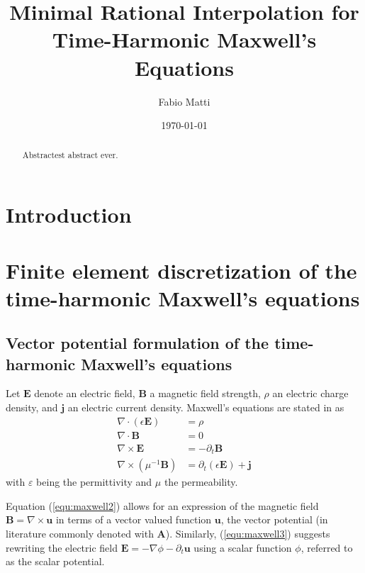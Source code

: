 \documentclass[11pt, a4paper]{article}
\title{Minimal Rational Interpolation for Time-Harmonic Maxwell's Equations}
\author{Fabio Matti}
\date{\today}
\begin{document}
\maketitle

\begin{abstract}
    Abstractest abstract ever.
\end{abstract}

\newpage
\printglossary[type=\acronymtype, nonumberlist]

\newpage
\tableofcontents

\newpage
\section{Introduction}
\label{sec:introduction}

\newpage
\section{Finite element discretization of the time-harmonic Maxwell's equations}
\label{sec:maxwell}

\subsection{Vector potential formulation of the time-harmonic Maxwell's equations}
\label{subsec:maxwell-potential}
\the\textwidth


Let $\mathbf{E}$ denote an electric field, $\mathbf{B}$ a magnetic field
strength, $\rho$ an electric charge density, and $\mathbf{j}$ an electric
current density. Maxwell's equations are stated in \citep{monk} as
\begin{align}
    \nabla \cdot (\epsilon \mathbf{E}) &= \rho \label{equ:maxwell1} \\
    \nabla \cdot \mathbf{B} &= 0 \label{equ:maxwell2} \\
    \nabla \times \mathbf{E} &= -\partial_t \mathbf{B} \label{equ:maxwell3} \\
    \nabla \times (\mu^{-1} \mathbf{B}) &= \partial_t (\epsilon \mathbf{E}) + \mathbf{j} \label{equ:maxwell4}
\end{align}
with $\varepsilon$ being the permittivity and $\mu$ the permeability.


Equation (\ref{equ:maxwell2}) allows for an expression of the magnetic field 
$\mathbf{B} = \nabla \times \mathbf{u}$ in terms of a vector valued function
$\mathbf{u}$, the vector potential (in literature commonly denoted with
$\mathbf{A}$). Similarly, (\ref{equ:maxwell3}) suggests
rewriting the electric field $\mathbf{E} = - \nabla \phi - \partial_t \mathbf{u}$
using a scalar function $\phi$, referred to as the scalar potential.
\end{document}
